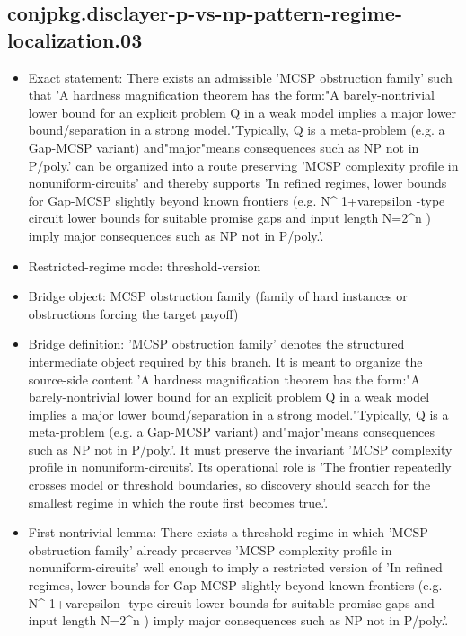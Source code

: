 \documentclass[11pt]{article}
\begin{document}
\subsection*{conjpkg.disclayer-p-vs-np-pattern-regime-localization.03}
\begin{itemize}
\item Exact statement: There exists an admissible 'MCSP obstruction family' such that 'A hardness magnification theorem has the form:"A barely-nontrivial lower bound for an explicit problem Q in a weak model implies a major lower bound/separation in a strong model."Typically, Q is a meta-problem (e.g. a Gap-MCSP variant) and"major"means consequences such as NP not in P/poly.' can be organized into a route preserving 'MCSP complexity profile in nonuniform-circuits' and thereby supports 'In refined regimes, lower bounds for Gap-MCSP slightly beyond known frontiers (e.g. N\textasciicircum{} 1+varepsilon -type circuit lower bounds for suitable promise gaps and input length N=2\textasciicircum{}n ) imply major consequences such as NP not in P/poly.'.
\item Restricted-regime mode: threshold-version
\item Bridge object: MCSP obstruction family (family of hard instances or obstructions forcing the target payoff)
\item Bridge definition: 'MCSP obstruction family' denotes the structured intermediate object required by this branch. It is meant to organize the source-side content 'A hardness magnification theorem has the form:"A barely-nontrivial lower bound for an explicit problem Q in a weak model implies a major lower bound/separation in a strong model."Typically, Q is a meta-problem (e.g. a Gap-MCSP variant) and"major"means consequences such as NP not in P/poly.'. It must preserve the invariant 'MCSP complexity profile in nonuniform-circuits'. Its operational role is 'The frontier repeatedly crosses model or threshold boundaries, so discovery should search for the smallest regime in which the route first becomes true.'.
\item First nontrivial lemma: There exists a threshold regime in which 'MCSP obstruction family' already preserves 'MCSP complexity profile in nonuniform-circuits' well enough to imply a restricted version of 'In refined regimes, lower bounds for Gap-MCSP slightly beyond known frontiers (e.g. N\textasciicircum{} 1+varepsilon -type circuit lower bounds for suitable promise gaps and input length N=2\textasciicircum{}n ) imply major consequences such as NP not in P/poly.'.

\end{itemize}
\end{document}
